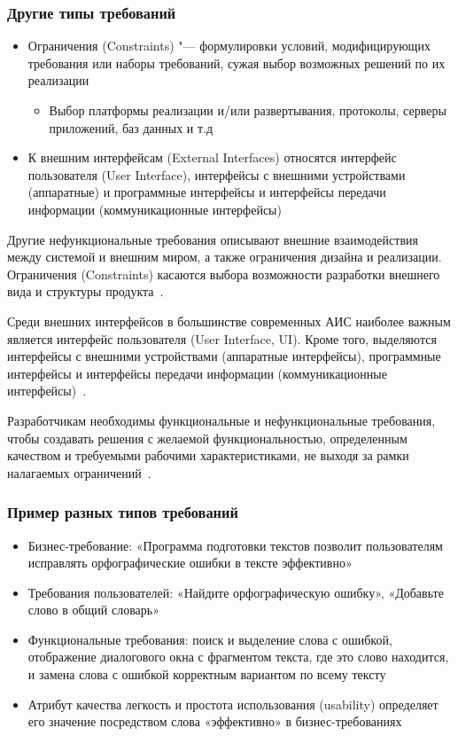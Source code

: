 \documentclass{../industrial-development}
\begin{document}
\begin{frame} \frametitle{Другие типы требований}
	\begin{itemize}
\item \alert{Ограничения (Constraints)} "--- формулировки условий, модифицирующих требования или наборы требований, сужая выбор возможных решений по их реализации
\begin{itemize}
	\item Выбор платформы реализации и/или развертывания, протоколы, серверы приложений, баз данных и т.д
\end{itemize}
\item К \alert{внешним интерфейсам (External Interfaces)} относятся интерфейс пользователя (User Interface), интерфейсы с внешними устройствами (аппаратные) и программные интерфейсы и интерфейсы передачи информации (коммуникационные интерфейсы)
	\end{itemize}
	\end{frame}

\lecturenotes

Другие нефункциональные требования описывают внешние взаимодействия между системой и внешним миром, а также ограничения дизайна и реализации. \alert{Ограничения (Constraints)} касаются выбора возможности разработки внешнего вида и структуры продукта~\cite[с.~10]{Wiegers}.

Среди \alert{внешних интерфейсов} в большинстве современных АИС наиболее важным является интерфейс пользователя (User Interface, UI). Кроме того, выделяются интерфейсы с внешними устройствами (аппаратные интерфейсы), программные интерфейсы и интерфейсы передачи информации (коммуникационные интерфейсы)~\cite[с.~10]{Maglinec}.

Разработчикам необходимы функциональные и нефункциональные требования, чтобы создавать решения с желаемой функциональностью, определенным качеством и требуемыми рабочими характеристиками, не выходя за рамки налагаемых ограничений~\cite[с.~11]{Wiegers}.


\begin{frame} \frametitle{Пример разных типов требований}
	\begin{itemize}
	\item \alert{Бизнес-требование}: «Программа подготовки текстов позволит пользователям исправлять орфографические ошибки в тексте эффективно»
	\item \alert{Требования пользователей}: «Найдите орфографическую ошибку», «Добавьте слово в общий словарь»
	\item \alert{Функциональные требования}: поиск и выделение слова с ошибкой, отображение диалогового окна с фрагментом текста, где это слово находится, и замена слова с ошибкой корректным вариантом по всему тексту
	\item \alert{Атрибут качества} легкость и простота использования (usability) определяет его значение посредством слова «эффективно» в бизнес-требованиях
	\end{itemize}
\end{frame}
\end{document}
